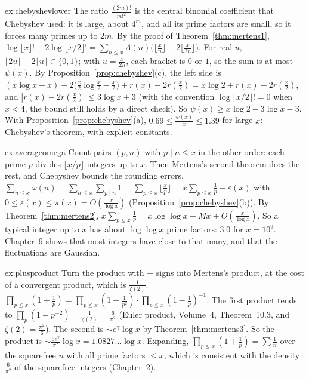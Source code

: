 \begin{solution}{ex:chebyshevlower}
\idea The ratio $\frac{(2m)!}{m!^2}$ is the central binomial coefficient that Chebyshev used: it is large, about $4^m$, and all its prime factors are small, so
it forces many primes up to $2m$.
\writeup By the proof of Theorem~\ref{thm:mertens1}, $\log\lfloor x\rfloor!-2\log\lfloor x/2\rfloor!=\sum_{n\le x}\Lambda(n)\bigl(\lfloor\frac xn\rfloor-2\lfloor\frac x{2n}\rfloor\bigr)$. For real $u$,
$\lfloor2u\rfloor-2\lfloor u\rfloor\in\{0,1\}$; with $u=\frac x{2n}$, each bracket is $0$ or $1$, so the sum is at most $\psi(x)$. By Proposition~\ref{prop:chebyshev}(c), the
left side is $(x\log x-x)-2\bigl(\frac x2\log\frac x2-\frac x2\bigr)+r(x)-2r(\frac x2)=x\log2+r(x)-2r(\frac x2)$, and $|r(x)-2r(\frac x2)|\le3\log x+3$ (with the convention
$\log\lfloor x/2\rfloor!=0$ when $x<4$, the bound still holds by a direct check). So $\psi(x)\ge x\log2-3\log x-3$. With Proposition~\ref{prop:chebyshev}(a),
$0.69\le\frac{\psi(x)}x\le1.39$ for large $x$: Chebyshev's theorem, with explicit constants.
\end{solution}

\begin{solution}{ex:averageomega}
\idea Count pairs $(p,n)$ with $p\mid n\le x$ in the other order: each prime $p$ divides $\lfloor x/p\rfloor$ integers up to $x$. Then Mertens's second theorem does
the rest, and Chebyshev bounds the rounding errors.
\writeup $\sum_{n\le x}\omega(n)=\sum_{n\le x}\sum_{p\mid n}1=\sum_{p\le x}\lfloor\frac xp\rfloor=x\sum_{p\le x}\frac1p-\varepsilon(x)$ with $0\le\varepsilon(x)\le\pi(x)=O(\frac x{\log x})$
(Proposition~\ref{prop:chebyshev}(b)). By Theorem~\ref{thm:mertens2}, $x\sum_{p\le x}\frac1p=x\log\log x+Mx+O(\frac x{\log x})$. So a typical integer up to $x$
has about $\log\log x$ prime factors: $3.0$ for $x=10^9$. Chapter~9 shows that most integers have close to that many, and that the fluctuations are Gaussian.
\end{solution}

\begin{solution}{ex:plusproduct}
\idea Turn the product with $+$ signs into Mertens's product, at the cost of a convergent product, which is $\frac1{\zeta(2)}$.
\writeup $\prod_{p\le x}(1+\frac1p)=\prod_{p\le x}(1-\frac1{p^2})\cdot\prod_{p\le x}(1-\frac1p)^{-1}$. The first product tends to $\prod_p(1-p^{-2})=\frac1{\zeta(2)}=\frac6{\pi^2}$ (Euler
product, Volume~4, Theorem~10.3, and $\zeta(2)=\frac{\pi^2}6$). The second is $\sim e^\gamma\log x$ by Theorem~\ref{thm:mertens3}. So the product is
$\sim\frac{6e^\gamma}{\pi^2}\log x=1.0827\ldots\log x$. Expanding, $\prod_{p\le x}(1+\frac1p)=\sum\frac1n$ over the squarefree $n$ with all prime factors $\le x$, which is consistent
with the density $\frac6{\pi^2}$ of the squarefree integers (Chapter~2).
\end{solution}

